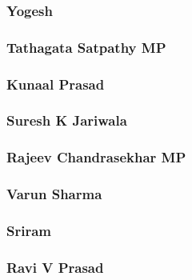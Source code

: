 \documentclass{article}
\begin{document}
\subsubsection{Yogesh}


% 

\subsubsection{Tathagata Satpathy MP}


\subsubsection{Kunaal Prasad}


\subsubsection{Suresh K Jariwala}


\subsubsection{Rajeev Chandrasekhar MP}


\subsubsection{Varun Sharma}


\subsubsection{Sriram}


\subsubsection{Ravi V Prasad}

\end{document}
